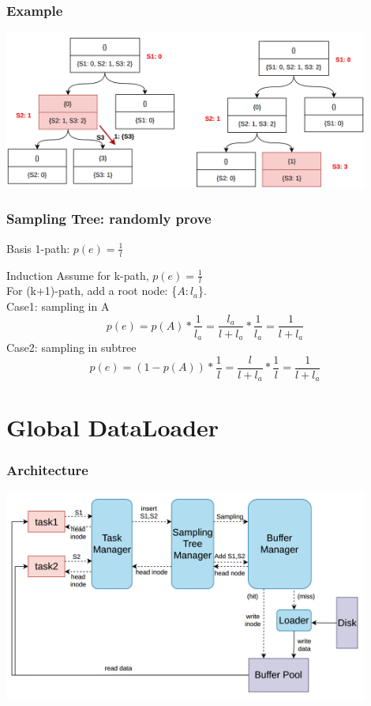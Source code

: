 \documentclass[notheorems, aspectratio=54]{beamer}
\begin{document}
\begin{frame}
    \frametitle{Example}
    \centering
    \includegraphics[width=12cm]{global_img_dir/exp2.png}
\end{frame}

\begin{frame}
    \frametitle{Sampling Tree: randomly prove}
    \begin{block}{Basis}
        1-path: $p(e) = \frac{1}{l}$
    \end{block}
    \begin{block}{Induction}
        Assume for k-path, $p(e) = \frac{1}{l}$\\
        For (k+1)-path, add a root node: \{$A: l_a$\}. \\
        Case1: sampling in A
        $$
        p(e) = p(A)*\frac{1}{l_a} = \frac{l_a}{l+l_a}*\frac{1}{l_a} = \frac{1}{l+l_a}
        $$
        Case2: sampling in subtree
        $$
        p(e) = (1-p(A))*\frac{1}{l} = \frac{l}{l+l_a}*\frac{1}{l} = \frac{1}{l+l_a}
        $$
    \end{block}
\end{frame}

\section{Global DataLoader}
\begin{frame}
    \frametitle{Architecture}
    \centering
    \includegraphics[width=12cm]{global_img_dir/archi.png}
\end{frame}
\end{document}
